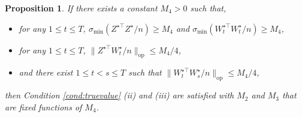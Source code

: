 \documentclass[12pt]{article}
\newcommand{\blue}[1]{\textcolor{blue}{#1}}
\newcommand{\red}[1]{\textcolor{red}{#1}}
\newtheorem{condition}{Condition}
\newtheorem{proposition}{Proposition}
\newcommand{\mytrans}{\top}
\begin{document}
\begin{proposition} \label{prop:condtion1}
If there exists a  constant $M_4>0$ such that, 
\begin{itemize}\setlength{\itemsep}{0pt}
\item[(a)] for any $1 \leqslant t \leqslant T$, 
$\sigma_{\operatorname{min}}(Z^{\star\top} Z^{\star}/n) \geqslant M_4$ and $\sigma_{\operatorname{min}}(W_t^{\star\top} W_t^{\star}/n) \geqslant M_4$, 

\item[(b)] for any $1 \leqslant t \leqslant T$, $\|Z^{\star\mytrans} W_t^{\star}/n\|_{\operatorname{op}} \leqslant  M_4/4$,
\item[(c)] and there exist $1 \leqslant t < s \leqslant T$ such that $\|W_t^{\star\mytrans} W_s^\star/n\|_{\operatorname{op}} \leqslant M_4/4$, 
\end{itemize}
then Condition \ref{cond:truevalue} (ii) and (iii) are satisfied with $M_2$ and $M_3$ that are fixed functions of $M_4$. 
\end{proposition}

\end{document}
